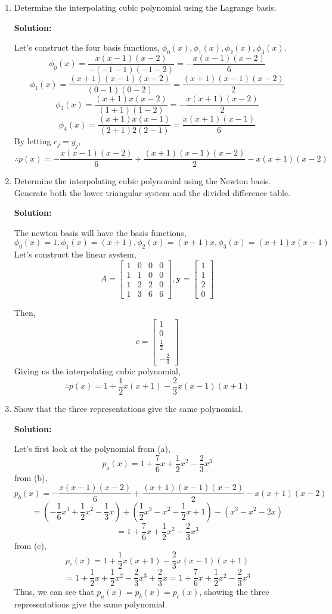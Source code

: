 \documentclass[11pt]{article}
\newenvironment{solution}
  {\par\noindent\textbf{Solution:}\par}
  {\par}
\begin{document}
\begin{enumerate}
\begin{enumerate}
\item Determine the interpolating cubic polynomial using the Lagrange basis.
  \begin{solution}
    Let's construct the four basis functions, $\phi_0(x),\phi_1(x),\phi_2(x),\phi_3(x)$.
    $$\phi_0(x) = \frac{x(x-1)(x-2)}{-(-1-1)(-1-2)} = -\frac{x(x-1)(x-2)}{6}$$
    $$\phi_1(x) = \frac{(x+1)(x-1)(x-2)}{(0-1)(0-2)}= \frac{(x+1)(x-1)(x-2)}{2}$$
    $$\phi_3(x) = \frac{(x+1)x(x-2)}{(1+1)(1-2)}=-\frac{x(x+1)(x-2)}{2}$$
    $$\phi_4(x) = \frac{(x+1)x(x-1)}{(2+1)2(2-1)}=\frac{x(x+1)(x-1)}{6}$$
    By letting $c_j = y_j$, 
    $$\therefore p(x) =  -\frac{x(x-1)(x-2)}{6} +\frac{(x+1)(x-1)(x-2)}{2} -  x(x+1)(x-2)$$
  \end{solution}
\item Determine the interpolating cubic polynomial using the Newton basis. Generate both the lower triangular system and the divided difference table.
  \begin{solution}
    The newton basis will have the basis functions,
    $$\phi_0(x) = 1, \phi_1(x) = (x+1), \phi_2(x) = (x+1)x, \phi_3(x) = (x+1)x(x-1)$$
    Let's construct the linear system,
    $$A= \begin{bmatrix}
      1 & 0 & 0 & 0 \\ 
      1 & 1 & 0 & 0 \\ 
      1 & 2 & 2 & 0 \\ 
      1 & 3 & 6 & 6 
      \end{bmatrix}, \textbf{y} = \begin{bmatrix} 1 \\ 1 \\ 2 \\ 0 \end{bmatrix}$$
  \end{solution} 
  Then, $$c = \begin{bmatrix} 1 \\ 0 \\ \frac{1}{2} \\[3pt] -\frac{2}{3} \end{bmatrix}$$
  Giving us the interpolating cubic polynomial,
  $$\therefore p(x) = 1 + \frac{1}{2}x(x+1) -\frac{2}{3}x(x-1)(x+1)$$

\item Show that the three representations give the same polynomial.

  \begin{solution}
    Let's first look at the polynomial from (a),
    $$p_a(x) = 1 + \frac{7}{6}x+\frac{1}{2}x^2-\frac{2}{3}x^3$$
    from (b),
    $$p_b(x) = -\frac{x(x-1)(x-2)}{6} +\frac{(x+1)(x-1)(x-2)}{2} -  x(x+1)(x-2) $$
    $$= (-\frac{1}{6}x^3+\frac{1}{2}x^2-\frac{1}{3}x) + (\frac{1}{2}x^3-x^2-\frac{1}{2}x+1) - (x^3-x^2-2x)$$
    $$=1 +  \frac{7}{6}x + \frac{1}{2}x^2 -\frac{2}{3}x^3$$
    from (c),
    $$p_c(x) = 1 + \frac{1}{2}x(x+1) -\frac{2}{3}x(x-1)(x+1) $$
    $$= 1 + \frac{1}{2}x + \frac{1}{2}x^2 - \frac{2}{3}x^3 + \frac{2}{3}x = 1 + \frac{7}{6}x + \frac{1}{2}x^2 - \frac{2}{3}x^3$$
    Thus, we can see that $p_a(x) = p_b(x) = p_c(x)$, showing the three representations give the same polynomial.
  \end{solution}


\end{enumerate}
\end{enumerate}
\end{document}
